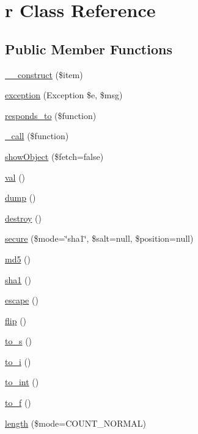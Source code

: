 \hypertarget{classr}{\section{r Class Reference}
\label{classr}
}
\subsection*{Public Member Functions}
\begin{DoxyCompactItemize}
\item 
\hyperlink{classr_a4b0c1fe0e6c94ec2df5006f414b164c4}{\-\_\-\-\_\-construct} (\$item)
\item 
\hyperlink{classr_ac53bb6cc3dad129127779798eb479903}{exception} (Exception \$e, \$msg)
\item 
\hyperlink{classr_ae9afa34c455aa79da5394a608f38386e}{responds\-\_\-to} (\$function)
\item 
\hyperlink{classr_af4b09312c3dd2b7ef02781c54c9a5244}{\-\_\-call} (\$function)
\item 
\hyperlink{classr_a979fd6f54086be01e4bdb059b26cec66}{show\-Object} (\$fetch=false)
\item 
\hyperlink{classr_af745c1e6bc71ed38a120043c0cb13416}{val} ()
\item 
\hyperlink{classr_a5bf63e4ac70cfd9d97e3f2eab936ec8b}{dump} ()
\item 
\hyperlink{classr_aa118461de946085fe42989193337044a}{destroy} ()
\item 
\hyperlink{classr_a983a9fa784e9028dea46897a760f1210}{secure} (\$mode=\char`\"{}sha1\char`\"{}, \$salt=null, \$position=null)
\item 
\hyperlink{classr_a63b637e71bf8bbee33889ae833423560}{md5} ()
\item 
\hyperlink{classr_a7751a3691d09eba1c3d390fdde2c4f4f}{sha1} ()
\item 
\hyperlink{classr_ab4e6060d5b0dd93113194ba83534d385}{escape} ()
\item 
\hyperlink{classr_ab7b978294481794664ea5ffa6530e020}{flip} ()
\item 
\hyperlink{classr_a4968be1bfca5da3a210d46e21bd080ff}{to\-\_\-s} ()
\item 
\hyperlink{classr_aa1ea52bbf266b7ba98c1198ca335ddf1}{to\-\_\-i} ()
\item 
\hyperlink{classr_a2d59e8b9284086c0dd59203615f28d2e}{to\-\_\-int} ()
\item 
\hyperlink{classr_ad12032cdf12c784eafa8994f13f464df}{to\-\_\-f} ()
\item 
\hyperlink{classr_a93564c0bb378f8d37470946df4d09ceb}{length} (\$mode=C\-O\-U\-N\-T\-\_\-\-N\-O\-R\-M\-A\-L)

\end{DoxyCompactItemize}

